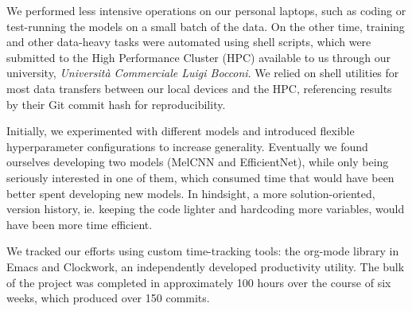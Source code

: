 \documentclass[10pt]{article}
\begin{document}
We performed less intensive operations on our personal laptops, such as coding or test-running the models on a small batch of the data. On the other time, training and other data-heavy tasks were automated using shell scripts, which were submitted to the High Performance Cluster (HPC) available to us through our university, \textit{Università Commerciale Luigi Bocconi}. We relied on shell utilities for most data transfers between our local devices and the HPC, referencing results by their Git commit hash for reproducibility.

Initially, we experimented with different models and introduced flexible hyperparameter configurations to increase generality. Eventually we found ourselves developing two models (MelCNN and EfficientNet), while only being seriously interested in one of them, which consumed time that would have been better spent developing new models. In hindsight, a more solution-oriented, version history, ie. keeping the code lighter and hardcoding more variables, would have been more time efficient.

We tracked our efforts using custom time-tracking tools: the org-mode library in Emacs and Clockwork, an independently developed productivity utility. The bulk of the project was completed in approximately 100 hours over the course of six weeks, which produced over 150 commits.
\end{document}
